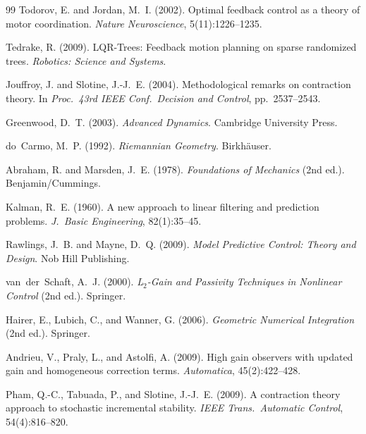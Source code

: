 \documentclass[11pt,letterpaper,openany]{book}
\theoremstyle{plain}
\theoremstyle{definition}
\theoremstyle{remark}
\begin{document}
\begin{thebibliography}{99}
Todorov, E. and Jordan, M.~I. (2002).
Optimal feedback control as a theory of motor coordination.
\textit{Nature Neuroscience}, 5(11):1226--1235.

Tedrake, R. (2009).
LQR-Trees: Feedback motion planning on sparse randomized trees.
\textit{Robotics: Science and Systems}.

Jouffroy, J. and Slotine, J.-J.~E. (2004).
Methodological remarks on contraction theory.
In \textit{Proc.\ 43rd IEEE Conf.\ Decision and Control}, pp.\ 2537--2543.

Greenwood, D.~T. (2003).
\textit{Advanced Dynamics}.
Cambridge University Press.

do~Carmo, M.~P. (1992).
\textit{Riemannian Geometry}.
Birkh\"auser.

Abraham, R. and Marsden, J.~E. (1978).
\textit{Foundations of Mechanics} (2nd ed.).
Benjamin/Cummings.

Kalman, R.~E. (1960).
A new approach to linear filtering and prediction problems.
\textit{J.\ Basic Engineering}, 82(1):35--45.

Rawlings, J.~B. and Mayne, D.~Q. (2009).
\textit{Model Predictive Control: Theory and Design}.
Nob Hill Publishing.

van~der~Schaft, A.~J. (2000).
\textit{L$_2$-Gain and Passivity Techniques in Nonlinear Control} (2nd ed.).
Springer.

Hairer, E., Lubich, C., and Wanner, G. (2006).
\textit{Geometric Numerical Integration} (2nd ed.).
Springer.

Andrieu, V., Praly, L., and Astolfi, A. (2009).
High gain observers with updated gain and homogeneous correction terms.
\textit{Automatica}, 45(2):422--428.

Pham, Q.-C., Tabuada, P., and Slotine, J.-J.~E. (2009).
A contraction theory approach to stochastic incremental stability.
\textit{IEEE Trans.\ Automatic Control}, 54(4):816--820.

\end{thebibliography}
\end{document}
